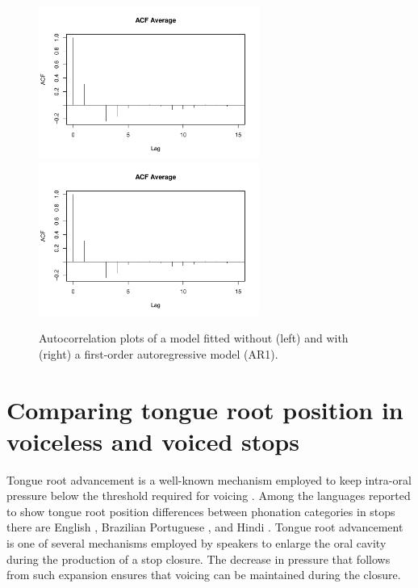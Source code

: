 \documentclass[11pt,]{article}
\begin{document}
\begin{figure}

{\centering \includegraphics[width=.7\linewidth,height=5cm]{2018-polar-gam_files/figure-latex/Figure06} \includegraphics[width=.7\linewidth,height=5cm]{2018-polar-gam_files/figure-latex/Figure06} 

}

\caption{Autocorrelation plots of a model fitted without (left) and with (right) a first-order autoregressive model (AR1).}\label{f:Figure06}
\end{figure}

\hypertarget{comparing-tongue-root-position-in-voiceless-and-voiced-stops}{%
\section{Comparing tongue root position in voiceless and voiced
stops}\label{comparing-tongue-root-position-in-voiceless-and-voiced-stops}}

Tongue root advancement is a well-known mechanism employed to keep
intra-oral pressure below the threshold required for voicing
\citep{ohala2011, kent1969, perkell1969, westbury1983, ahn2018}. Among
the languages reported to show tongue root position differences between
phonation categories in stops there are English
\citep{westbury1983, ahn2018}, Brazilian Portuguese \citep{ahn2018}, and
Hindi \citep{ahn2016a}. Tongue root advancement is one of several
mechanisms employed by speakers to enlarge the oral cavity during the
production of a stop closure. The decrease in pressure that follows from
such expansion ensures that voicing can be maintained during the
closure.
\end{document}
